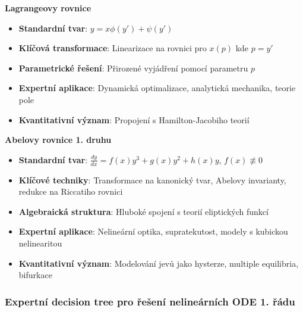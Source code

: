 \vspace{1\baselineskip}

\noindent\textbf{Lagrangeovy rovnice}
\begin{itemize}
\item \textbf{Standardní tvar}: $y = x\phi(y') + \psi(y')$
\item \textbf{Klíčová transformace}: Linearizace na rovnici pro $x(p)$ kde $p = y'$
\item \textbf{Parametrické řešení}: Přirozené vyjádření pomocí parametru $p$
\item \textbf{Expertní aplikace}: Dynamická optimalizace, analytická mechanika, teorie pole
\item \textbf{Kvantitativní význam}: Propojení s Hamilton-Jacobiho teorií
\end{itemize}

\vspace{1\baselineskip}

\noindent\textbf{Abelovy rovnice 1. druhu}
\begin{itemize}
\item \textbf{Standardní tvar}: $\frac{dy}{dx} = f(x)y^3 + g(x)y^2 + h(x)y$, $f(x) \not\equiv 0$
\item \textbf{Klíčové techniky}: Transformace na kanonický tvar, Abelovy invarianty, redukce na Riccatiho rovnici
\item \textbf{Algebraická struktura}: Hluboké spojení s teorií eliptických funkcí
\item \textbf{Expertní aplikace}: Nelineární optika, supratekutost, modely s kubickou nelinearitou
\item \textbf{Kvantitativní význam}: Modelování jevů jako hysterze, multiple equilibria, bifurkace
\end{itemize}

\subsubsection{Expertní decision tree pro řešení nelineárních ODE 1. řádu}
\label{subsec:decision-tree-uroven2}

